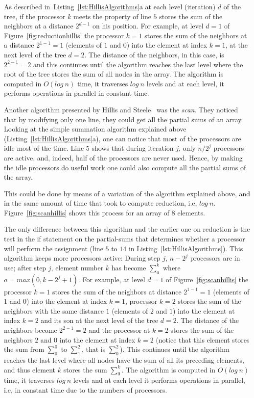 \documentclass[Ingles]{ic-tese-v1}
\newcommand{\rfig}[1]{Figure~\ref{fig:#1}}
\newcommand{\tit}[1]{{\textit{#1}}}
\newcommand{\rlsts}[2]{Listing~\ref{lst:#1}{#2}}
\begin{document}
As described in~\rlsts{HillisAlgorithms}{a} at each level
(iteration) $d$ of the tree, if the processor $k$  meets the property of line $5$ 
stores the sum of the neighbors at a distance $2^{d-1}$ on his position.
For  example, at  level $d  = 1$  of \rfig{reductionhillis} the processor $k = 1$ stores the sum of the neighbors at a distance $2^{1-1} = 1$ (elements of $1$ and $0$) into the element at index $k = 1$, at the  next level of  the tree $d = 2$. The distance of the
neighbors, in this case, is  $2^{2-1} = 2$ and this continues until the algorithm reaches the last level where the root of the tree stores the sum of all nodes in the array. The algorithm is computed in $O(log\ n)$ time, it traverses $log\ n$ levels and at each level, it performs operations in parallel in constant time.

Another algorithm presented by Hillis and Steele~\cite{dataparallel} was the
\tit{scan}. They noticed that by modifying only one line, they could get all the partial
sums of an array.  Looking at the simple summation algorithm explained
above (\rlsts{HillisAlgorithms}{a}), one can notice that most of the
processors are idle most of the time. Line $5$ shows that during iteration $j$,
only $n/2^{j}$ processors are active, and, indeed, half of the processors are
never used. Hence, by making the idle processors do useful work
one could also compute all the partial sums of the array.

This could be done  by means of a variation of the  algorithm explained above, and  in the
same  amount of time that took to compute reduction, i.e, $log\ n$.
\rfig{scanhillis} shows this process for an array of 8
elements.

The only difference between this algorithm and the earlier one on reduction is
the test in the if statement on the partial-sums
that determines whether a processor will perform the assignment (line $5$ to $14$ in \rlsts{HillisAlgorithms}). This
algorithm keeps more processors active: During step $j$, $n - 2^{j}$ processors
are in use; after step $j$, element number $k$ has become $\sum_{a}^{k}$ where
$a = max(0, k - 2^{j} + 1)$. For  example, at  level $d  = 1$  of
\rfig{scanhillis} the processor $k = 1$ stores the sum of the neighbors at
distance $2^{1-1} = 1$ (elements of $1$ and $0$) into the element at index $k =
1$, processor $k = 2$ stores the sum of the neighbors with the same
distance $1$ (elements of $2$ and $1$) into the element at index $k = 2$ and
its son at the  next level of  the tree $d = 2$.
The distance of the neighbors become  $2^{2-1} = 2$ and the processor at $k = 2$ stores the
sum of the neighbors $2$ and $0$ into the element at index $k = 2$ (notice that this element stores the
sum from $\sum_{0}^{0}$ to $\sum_{1}^{2}$, that is $\sum_{0}^{2}$). This continues until
the algorithm reaches the last level where all nodes have the sum of all its preceding
elements, and thus  element $k$ stores the sum $\sum_{0}^{k}$.
The algorithm
is computed in $O(log\ n)$ time, it traverses $log\ n$ levels and at each level it
performs operations in parallel, i.e, in constant time due to the numbers of processors.
\end{document}
